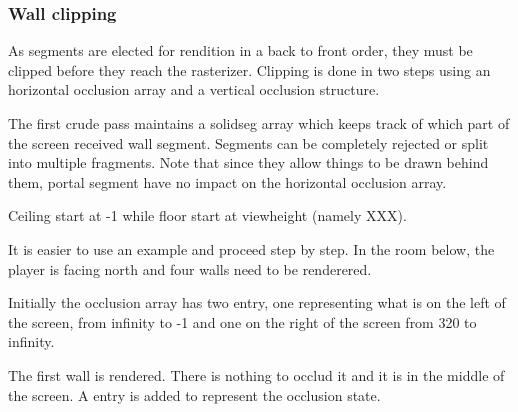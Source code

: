 \subsubsection{Wall clipping}
As segments are elected for rendition in a back to front order, they must be clipped before they reach the rasterizer. Clipping is done in two steps using an horizontal occlusion array and a vertical occlusion structure.\\
\par
The first crude pass maintains a solidseg array which keeps track of which part of the screen received wall segment. Segments can be completely rejected or split into multiple fragments. Note that since they allow things to be drawn behind them, portal segment have no impact on the horizontal occlusion array.\\
\par
Ceiling start at -1 while floor start at viewheight (namely XXX).
\par
{}
\par
It is easier to use an example and proceed step by step. In the room below, the player is facing north and four walls need to be renderered.
\par
{}
\par

Initially the occlusion array has two entry, one representing what is on the left of the screen, from infinity to -1 and one on the right of the screen from 320 to infinity.\\
\par 
\begin{minipage}{0.54\textwidth}
\centering
{}
\end{minipage}
\begin{minipage}{0.46\textwidth}
\centering
{}
\end{minipage}
\par






The first wall is rendered. There is nothing to occlud it and it is in the middle of the screen. A entry is added to represent the occlusion state.\\
\par
\begin{minipage}{0.54\textwidth}
\centering
{}
\end{minipage}
\begin{minipage}{0.46\textwidth}
\centering
{}
\end{minipage}
\par



